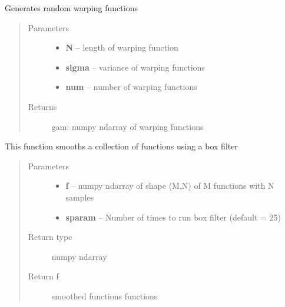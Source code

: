 \documentclass[letterpaper,10pt,english]{sphinxmanual}
\begin{document}

\begin{fulllineitems}
\label{utility_functions:utility_functions.rgam}
Generates random warping functions
\begin{quote}\begin{description}
\item[{Parameters}] \leavevmode\begin{itemize}
\item {} 
\textbf{N} -- length of warping function

\item {} 
\textbf{sigma} -- variance of warping functions

\item {} 
\textbf{num} -- number of warping functions

\end{itemize}

\item[{Returns}] \leavevmode
gam: numpy ndarray of warping functions

\end{description}\end{quote}

\end{fulllineitems}


\begin{fulllineitems}
\label{utility_functions:utility_functions.smooth_data}
This function smooths a collection of functions using a box filter
\begin{quote}\begin{description}
\item[{Parameters}] \leavevmode\begin{itemize}
\item {} 
\textbf{f} -- numpy ndarray of shape (M,N) of M functions with N samples

\item {} 
\textbf{sparam} -- Number of times to run box filter (default = 25)

\end{itemize}

\item[{Return type}] \leavevmode
numpy ndarray

\item[{Return f}] \leavevmode
smoothed functions functions

\end{description}\end{quote}

\end{fulllineitems}
\end{document}
